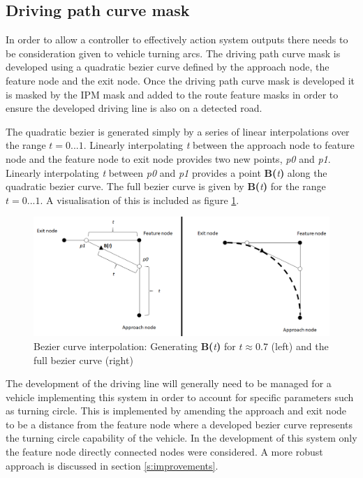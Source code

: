 \documentclass[]{aiaa-tc}%
\begin{document}
\subsection{Driving path curve mask} \label{s:drivingPathMatching}

In order to allow a controller to effectively action system outputs there needs to be consideration given to vehicle turning arcs. The driving path curve mask is developed using a quadratic bezier curve defined by the approach node, the feature node and the exit node. Once the driving path curve mask is developed it is masked by the IPM mask and added to the route feature masks in order to ensure the developed driving line is also on a detected road. 

The quadratic bezier is generated simply by a series of linear interpolations over the range $t=0...1$. Linearly interpolating \textit{t} between the approach node to feature node and the feature node to exit node provides two new points, \textit{p0} and \textit{p1}. Linearly interpolating \textit{t} between \textit{p0} and \textit{p1} provides a point \textbf{B(}\textit{t}\textbf{)} along the quadratic bezier curve. The full bezier curve is given by \textbf{B(}\textit{t}\textbf{)} for the range $t=0...1$. A visualisation of this is included as figure \ref{f:quadraticBezier}.

\begin{figure}
	\centering
	\includegraphics[width=1\textwidth]{bezier/quadraticBezier.png}
	\caption{Bezier curve interpolation: Generating \textbf{B(}\textit{t}\textbf{)} for $t\approx0.7$ (left) and the full bezier curve (right)}
	\label{f:quadraticBezier}
\end{figure}

The development of the driving line will generally need to be managed for a vehicle implementing this system in order to account for specific parameters such as turning circle. This is implemented by amending the approach and exit node to be a distance from the feature node where a developed bezier curve represents the turning circle capability of the vehicle. In the development of this system only the feature node directly connected nodes were considered. A more robust approach is discussed in section \ref{s:improvements}.
\end{document}
